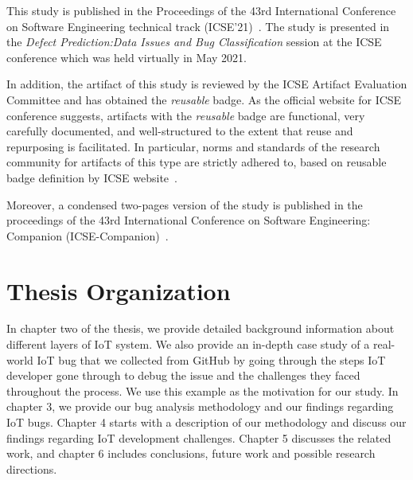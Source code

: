 This study is published in the Proceedings of the 43rd International Conference on Software Engineering technical track (ICSE'21)~\cite{makhshari2021iot}. The study is presented in the \textit{Defect Prediction:Data Issues and Bug Classification} session at the ICSE conference which was held virtually in May 2021.

In addition, the artifact of this study is reviewed by the ICSE Artifact Evaluation Committee and has obtained the \textit{reusable} badge. As the official website for ICSE conference suggests, artifacts with the \textit{reusable} badge are functional, very carefully documented, and well-structured to the extent that reuse and repurposing is facilitated. In particular, norms and standards of the research community for artifacts of this type are strictly adhered to, based on reusable badge definition by ICSE website~\cite{icseAE}.

Moreover, a condensed two-pages version of the study is published in the proceedings of the 43rd International Conference on Software Engineering: Companion (ICSE-Companion)~\cite{makhshari2021iotCompanion}.

\section{Thesis Organization }
In chapter two of the thesis, we provide detailed background information about different layers of IoT system. We also provide an in-depth case study of a real-world IoT bug that we collected from GitHub by going through the steps IoT developer gone through to debug the issue and the challenges they faced throughout the process. We use this example as the motivation for our study. In chapter 3, we provide our bug analysis methodology and our findings regarding IoT bugs. Chapter 4 starts with a description of our methodology and discuss our findings regarding IoT development challenges. Chapter 5 discusses the related work, and chapter 6 includes conclusions, future work and possible research directions.

\endinput

